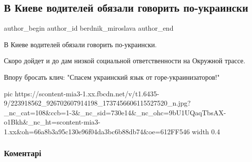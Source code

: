  
 
 
 
 
 
\subsection{В Киеве водителей обязали говорить по-украински}
\label{sec:29_07_2021.fb.berdnik_miroslava.3.marshrutka_mova_voditeli}
 
\ifcmt
 author_begin
   author_id berdnik_miroslava
 author_end
\fi

В Киеве водителей обязали говорить по-украински.

Скоро дойдет и до дам низкой социальной ответственности на Окружной трассе.

Впору бросать клич: "Спасем украинский язык от горе-украинизаторов!"

\ifcmt
  pic https://scontent-mia3-1.xx.fbcdn.net/v/t1.6435-9/223918562_926702607914198_1737456606115527520_n.jpg?_nc_cat=108&ccb=1-3&_nc_sid=730e14&_nc_ohc=9bU1UQaqTbsAX-o1Bkh&_nc_ht=scontent-mia3-1.xx&oh=66a8b3a95c130e96f04da3bc6b88db74&oe=612FF546
  width 0.4
\fi

\subsubsection{Коментарі}

